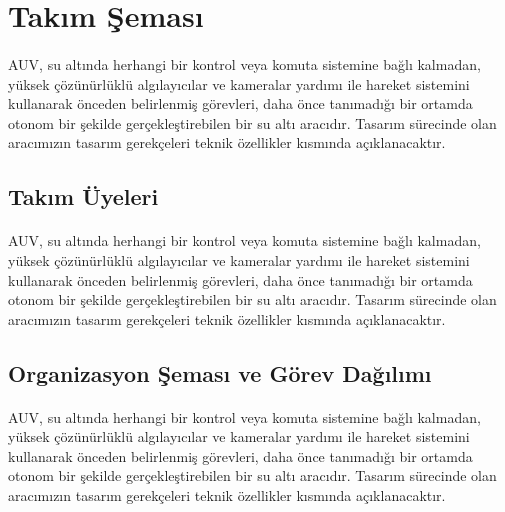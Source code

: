 \documentclass[12pt]{article}
\begin{document}
\section{Takım Şeması}

\begin{justify}
\paragraph{} AUV, su altında herhangi bir kontrol veya komuta sistemine bağlı kalmadan, yüksek çözünürlüklü algılayıcılar ve kameralar yardımı ile hareket sistemini kullanarak önceden belirlenmiş görevleri, daha önce tanımadığı bir ortamda otonom bir şekilde gerçekleştirebilen bir su altı aracıdır. Tasarım sürecinde olan aracımızın tasarım gerekçeleri teknik özellikler kısmında açıklanacaktır.
\end{justify}

\subsection{Takım Üyeleri}

\begin{justify}
\paragraph{} AUV, su altında herhangi bir kontrol veya komuta sistemine bağlı kalmadan, yüksek çözünürlüklü algılayıcılar ve kameralar yardımı ile hareket sistemini kullanarak önceden belirlenmiş görevleri, daha önce tanımadığı bir ortamda otonom bir şekilde gerçekleştirebilen bir su altı aracıdır. Tasarım sürecinde olan aracımızın tasarım gerekçeleri teknik özellikler kısmında açıklanacaktır.
\end{justify}

\subsection{Organizasyon Şeması ve Görev Dağılımı}

\begin{justify}
\paragraph{} AUV, su altında herhangi bir kontrol veya komuta sistemine bağlı kalmadan, yüksek çözünürlüklü algılayıcılar ve kameralar yardımı ile hareket sistemini kullanarak önceden belirlenmiş görevleri, daha önce tanımadığı bir ortamda otonom bir şekilde gerçekleştirebilen bir su altı aracıdır. Tasarım sürecinde olan aracımızın tasarım gerekçeleri teknik özellikler kısmında açıklanacaktır.
\end{justify}
\end{document}
